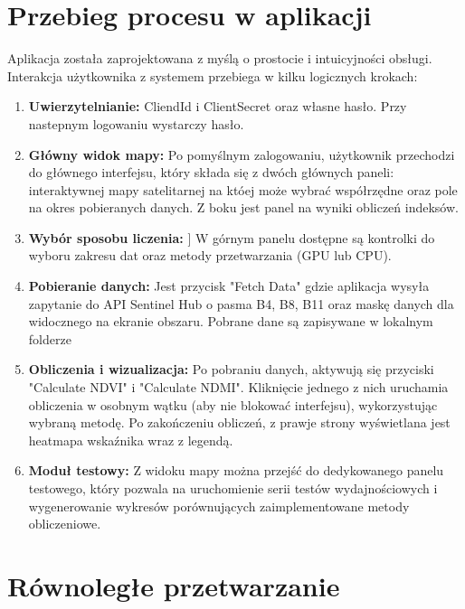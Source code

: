 \documentclass[12pt,a4paper]{article}
\begin{document}
\section{Przebieg procesu w aplikacji}
Aplikacja została zaprojektowana z myślą o prostocie i intuicyjności obsługi. Interakcja użytkownika z systemem przebiega w kilku logicznych krokach:
\begin{enumerate}
    \item \textbf{Uwierzytelnianie:} CliendId i ClientSecret oraz własne hasło. Przy nastepnym logowaniu wystarczy hasło.
    \item \textbf{Główny widok mapy:} Po pomyślnym zalogowaniu, użytkownik przechodzi do głównego interfejsu, który składa się z dwóch głównych paneli: interaktywnej mapy satelitarnej na któej może wybrać współrzędne oraz pole na okres pobieranych danych. Z boku jest panel na wyniki obliczeń indeksów.
    \item \textbf{Wybór sposobu liczenia:} ] W górnym panelu dostępne są kontrolki do wyboru zakresu dat oraz metody przetwarzania (GPU lub CPU).
    \item \textbf{Pobieranie danych:} Jest przycisk "Fetch Data" gdzie aplikacja wysyła zapytanie do API Sentinel Hub o pasma B4, B8, B11 oraz maskę danych dla widocznego na ekranie obszaru. Pobrane dane są zapisywane w lokalnym folderze 
    \item \textbf{Obliczenia i wizualizacja:} Po pobraniu danych, aktywują się przyciski "Calculate NDVI" i "Calculate NDMI". Kliknięcie jednego z nich uruchamia obliczenia w osobnym wątku (aby nie blokować interfejsu), wykorzystując wybraną metodę. Po zakończeniu obliczeń, z prawje strony wyświetlana jest heatmapa wskaźnika wraz z legendą.
    \item \textbf{Moduł testowy:} Z widoku mapy można przejść do dedykowanego panelu testowego, który pozwala na uruchomienie serii testów wydajnościowych i wygenerowanie  wykresów porównujących zaimplementowane metody obliczeniowe.
\end{enumerate}

\section{Równoległe przetwarzanie}
\end{document}
